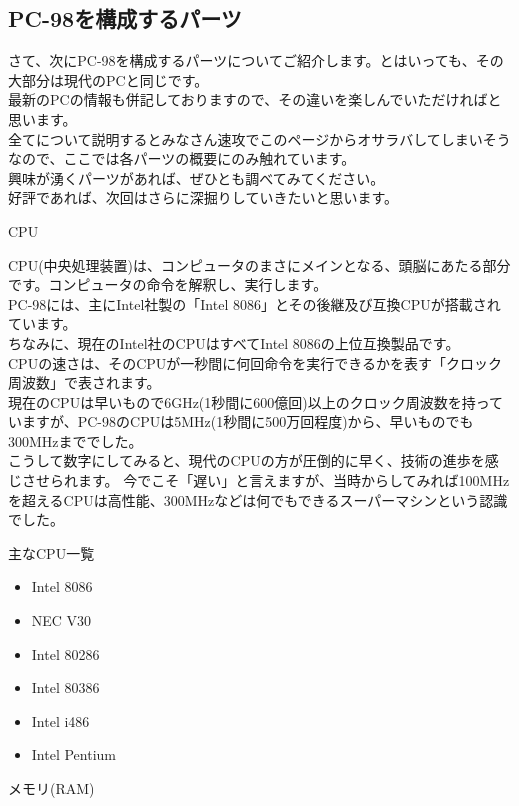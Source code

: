 \documentclass[b5paper,9pt,platex,dvipdfmx]{jsarticle}
\begin{document}
\begin{multicols*}{3}
\section[short]{PC-98を構成するパーツ}
さて、次にPC-98を構成するパーツについてご紹介します。とはいっても、その大部分は現代のPCと同じです。\\
最新のPCの情報も併記しておりますので、その違いを楽しんでいただければと思います。\\
全てについて説明するとみなさん速攻でこのページからオサラバしてしまいそうなので、ここでは各パーツの概要にのみ触れています。\\
興味が湧くパーツがあれば、ぜひとも調べてみてください。\\
好評であれば、次回はさらに深掘りしていきたいと思います。\\
\begin{enumerate}
  {\bf  \item CPU\\}
CPU(中央処理装置)は、コンピュータのまさにメインとなる、頭脳にあたる部分です。コンピュータの命令を解釈し、実行します。\\
PC-98には、主にIntel社製の「Intel 8086」とその後継及び互換CPUが搭載されています。\\
ちなみに、現在のIntel社のCPUはすべてIntel 8086の上位互換製品です。\\
CPUの速さは、そのCPUが一秒間に何回命令を実行できるかを表す「クロック周波数」で表されます。\\
現在のCPUは早いもので6GHz(1秒間に600億回)以上のクロック周波数を持っていますが、PC-98のCPUは5MHz(1秒間に500万回程度)から、早いものでも300MHzまででした。\\
こうして数字にしてみると、現代のCPUの方が圧倒的に早く、技術の進歩を感じさせられます。
今でこそ「遅い」と言えますが、当時からしてみれば100MHzを超えるCPUは高性能、300MHzなどは何でもできるスーパーマシンという認識でした。\\
\begin{itembox}[l]{主なCPU一覧}
  \begin{itemize}
    \item Intel 8086
    \item NEC V30
    \item Intel 80286
    \item Intel 80386
    \item Intel i486
    \item Intel Pentium
  \end{itemize}
\end{itembox}
  {\bf  \item メモリ(RAM)\\}

\end{enumerate}
\end{multicols*}
\end{document}

